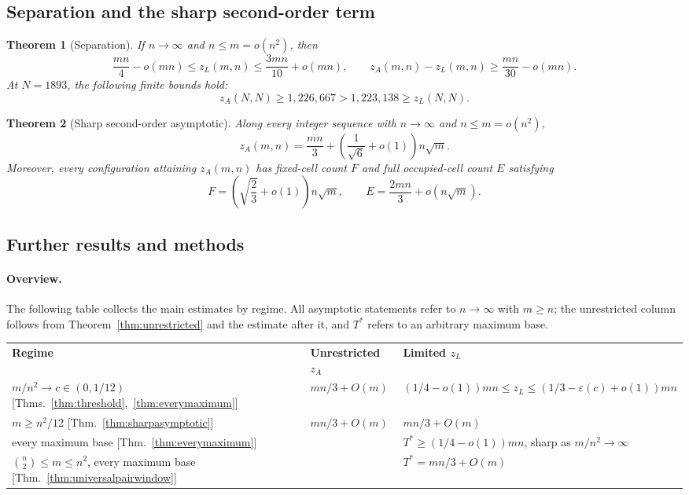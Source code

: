 \documentclass[11pt]{article}
\newtheorem{theorem}{Theorem}
\newcommand{\za}{z_A}
\newcommand{\zl}{z_L}
\begin{document}
\subsection{Separation and the sharp second-order term}
\begin{theorem}[Separation]\label{thm:separation}
If $n\to\infty$ and $n\le m=o(n^2)$, then
\[
 \frac{mn}{4}-o(mn)\le\zl(m,n)\le\frac{3mn}{10}+o(mn),\qquad
 \za(m,n)-\zl(m,n)\ge\frac{mn}{30}-o(mn).
\]
At $N=1893$, the following finite bounds hold:
\[
 \za(N,N)\ge1{,}226{,}667>1{,}223{,}138\ge\zl(N,N).
\]
\end{theorem}

\begin{theorem}[Sharp second-order asymptotic]\label{thm:secondorder}
Along every integer sequence with $n\to\infty$ and $n\le m=o(n^2)$,
\[
 z_A(m,n)=\frac{mn}{3}
       +\left(\frac1{\sqrt6}+o(1)\right)n\sqrt m.
\]
Moreover, every configuration attaining $z_A(m,n)$ has fixed-cell count
$F$ and full occupied-cell count $E$ satisfying
\[
 F=\left(\sqrt{\frac23}+o(1)\right)n\sqrt m,
 \qquad E=\frac{2mn}{3}+o(n\sqrt m).
\]
\end{theorem}

\subsection{Further results and methods}

\paragraph{Overview.}
The following table collects the main estimates by regime. All asymptotic
statements refer to $n\to\infty$ with $m\ge n$; the unrestricted column
follows from Theorem~\ref{thm:unrestricted} and the estimate after it, and
$T^*$ refers to an arbitrary maximum base.
\begin{center}
\small
\setlength{\tabcolsep}{5pt}
\begin{tabular}{@{}>{\raggedright\arraybackslash}p{1.75in}ll@{}}
\textbf{Regime}&\textbf{Unrestricted $\za$}&\textbf{Limited $\zl$}\\[2pt]
$m/n^2\to c\in(0,1/12)$ [Thms.~\ref{thm:threshold},~\ref{thm:everymaximum}]
 &$mn/3+O(m)$
 &$(1/4-o(1))mn\le\zl\le(1/3-\varepsilon(c)+o(1))mn$\\[3pt]
$m\ge n^2/12$ [Thm.~\ref{thm:sharpasymptotic}]
 &$mn/3+O(m)$
 &$mn/3+O(m)$\\[3pt]
every maximum base [Thm.~\ref{thm:everymaximum}]
 &
 &$T^*\ge(1/4-o(1))mn$, sharp as $m/n^2\to\infty$\\[3pt]
$\binom n2\le m\le n^2$, every maximum base [Thm.~\ref{thm:universalpairwindow}]
 &
 &$T^*=mn/3+O(m)$
\end{tabular}
\end{center}
\end{document}
